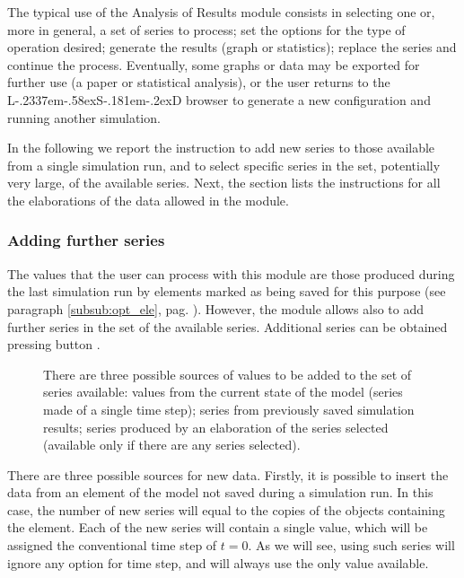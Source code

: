 \documentclass [11pt,a4paper] {book}
\def\LsD{{L\kern-.2337em\lower-.58ex\hbox{S}\kern-.181em\lower-.2ex\hbox{D}}\xspace}
\begin{document}
The typical use of the Analysis of Results module consists in selecting one or, more in general, a set of series to process; set the options for the type of operation desired; generate the results (graph or statistics); replace the series and continue the process. Eventually, some graphs or data may be exported for further use (a paper or statistical analysis), or the user returns to the \LsD browser to generate a new configuration and running another simulation.


In the following we report the instruction to add new series to those available from a single simulation run, and to select specific series in the set, potentially very large, of the available series. Next, the section lists the instructions for all the elaborations of the data allowed in the module.

\subsubsection{Adding further series}

The values that the user can process with this module are those produced during the last simulation run by elements marked as being saved for this purpose (see paragraph \ref{subsub:opt_ele}, pag. \pageref{subsub:opt_ele}). However, the module allows also to add further series in the set of the available series. Additional series can be obtained pressing button .


\begin{figure}[ht]
  \centering
  \caption{\small There are three possible sources of values to be added to the set of series available: values from the current state of the model (series made of a single time step); series from previously saved simulation results; series produced by an elaboration of the series selected (available only if there are any series selected).}
  \label{fig:add_series}
\end{figure}

There are three possible sources for new data. Firstly, it is possible to insert the data from an element of the model not saved during a simulation run. In this case, the number of new series will equal to the copies of the objects containing the element. Each of the new series will contain a single value, which will be assigned the conventional time step of $t=0$. As we will see, using such series will ignore any option for time step, and will always use the only value available.
\end{document}
